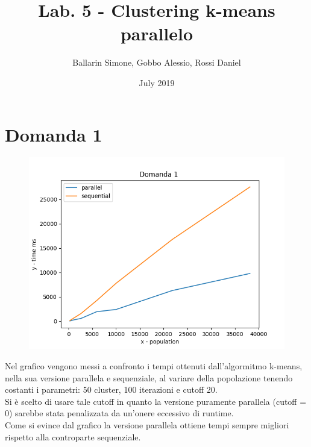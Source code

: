 \documentclass{article}
\title{Lab. 5 - Clustering k-means parallelo}
\author{Ballarin Simone, Gobbo Alessio, Rossi Daniel}
\date{July 2019}
\begin{document}
\maketitle

\section*{Domanda 1}
\begin{center}
	\begin{figure}[H]
		\includegraphics[width=1\linewidth, valign=t]{figures/domanda1}
	\end{figure}
\end{center}
Nel grafico vengono messi a confronto i tempi ottenuti dall'algormitmo k-means, nella sua versione parallela e sequenziale, al variare della popolazione tenendo costanti i parametri: 50 cluster, 100 iterazioni e cutoff 20.\\
Si è scelto di usare tale cutoff in quanto la versione puramente parallela (cutoff = 0) sarebbe stata penalizzata da un'onere eccessivo di runtime.\\
Come si evince dal grafico la versione parallela ottiene tempi sempre migliori rispetto alla controparte sequenziale.
\end{document}
